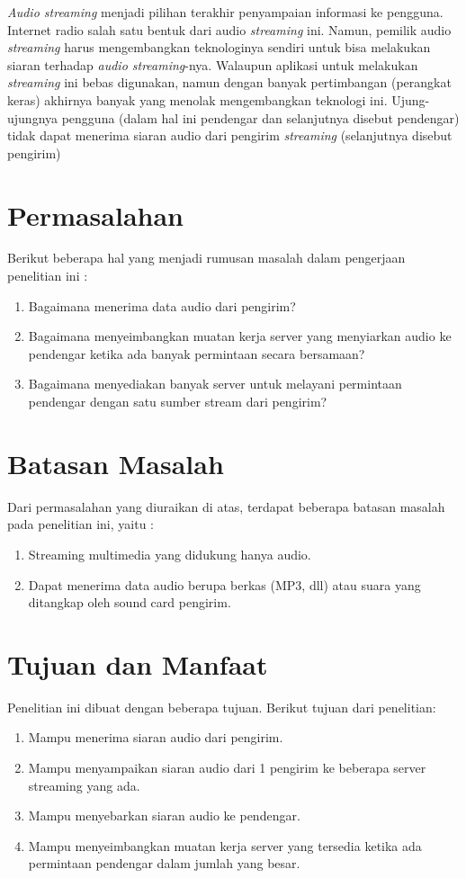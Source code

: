 \documentclass[oneside]{book}
\begin{document}
	\textit{Audio streaming} menjadi pilihan terakhir penyampaian informasi ke pengguna. Internet radio salah satu bentuk dari audio \textit{streaming} ini. Namun, pemilik audio \textit{streaming} harus mengembangkan teknologinya sendiri untuk bisa melakukan siaran terhadap \textit{audio streaming}-nya. Walaupun aplikasi untuk melakukan \textit{streaming} ini bebas digunakan, namun dengan banyak pertimbangan (perangkat keras) akhirnya banyak yang menolak mengembangkan teknologi ini. Ujung-ujungnya pengguna (dalam hal ini pendengar dan selanjutnya disebut pendengar) tidak dapat menerima siaran audio dari pengirim \textit{streaming} (selanjutnya disebut pengirim)
	
	\section{Permasalahan}
	Berikut beberapa hal yang menjadi rumusan masalah dalam pengerjaan penelitian ini :
	\begin{enumerate}
		\item Bagaimana menerima data audio dari pengirim?
		\item Bagaimana menyeimbangkan muatan kerja server yang menyiarkan audio ke pendengar ketika ada banyak permintaan secara bersamaan?
		\item Bagaimana menyediakan banyak server untuk melayani permintaan pendengar dengan satu sumber stream dari pengirim?
	\end{enumerate}
	
	\section{Batasan Masalah}
	Dari permasalahan yang diuraikan di atas, terdapat beberapa batasan masalah pada penelitian ini, yaitu :
	\begin{enumerate}
		\item Streaming multimedia yang didukung hanya audio.
		\item Dapat menerima data audio berupa berkas (MP3, dll) atau suara yang ditangkap oleh sound card pengirim.
	\end{enumerate}
	
	\section{Tujuan dan Manfaat}
	Penelitian ini dibuat dengan beberapa tujuan. Berikut tujuan dari penelitian:
	\begin{enumerate}
		\item Mampu menerima siaran audio dari pengirim.
		\item Mampu menyampaikan siaran audio dari 1 pengirim ke beberapa server streaming yang ada.
		\item Mampu menyebarkan siaran audio ke pendengar.
		\item Mampu menyeimbangkan muatan kerja server yang tersedia ketika ada permintaan pendengar dalam jumlah yang besar.
	\end{enumerate}
\end{document}
